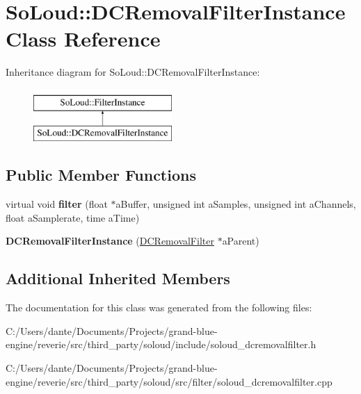 \hypertarget{class_so_loud_1_1_d_c_removal_filter_instance}{}\section{So\+Loud\+::D\+C\+Removal\+Filter\+Instance Class Reference}
\label{class_so_loud_1_1_d_c_removal_filter_instance}
Inheritance diagram for So\+Loud\+::D\+C\+Removal\+Filter\+Instance\+:\begin{figure}[H]
\begin{center}
\leavevmode
\includegraphics[height=2.000000cm]{class_so_loud_1_1_d_c_removal_filter_instance}
\end{center}
\end{figure}
\subsection*{Public Member Functions}
\begin{DoxyCompactItemize}
\item 
\mbox{\label{class_so_loud_1_1_d_c_removal_filter_instance_a81d7983a788c7e1d6c6f7f5e8b058139}} 
virtual void {\bfseries filter} (float $\ast$a\+Buffer, unsigned int a\+Samples, unsigned int a\+Channels, float a\+Samplerate, time a\+Time)
\item 
\mbox{\label{class_so_loud_1_1_d_c_removal_filter_instance_a761eab639e22ec88ae747a58795a9337}} 
{\bfseries D\+C\+Removal\+Filter\+Instance} (\mbox{\hyperlink{class_so_loud_1_1_d_c_removal_filter}{D\+C\+Removal\+Filter}} $\ast$a\+Parent)
\end{DoxyCompactItemize}
\subsection*{Additional Inherited Members}


The documentation for this class was generated from the following files\+:\begin{DoxyCompactItemize}
\item 
C\+:/\+Users/dante/\+Documents/\+Projects/grand-\/blue-\/engine/reverie/src/third\+\_\+party/soloud/include/soloud\+\_\+dcremovalfilter.\+h\item 
C\+:/\+Users/dante/\+Documents/\+Projects/grand-\/blue-\/engine/reverie/src/third\+\_\+party/soloud/src/filter/soloud\+\_\+dcremovalfilter.\+cpp\end{DoxyCompactItemize}
